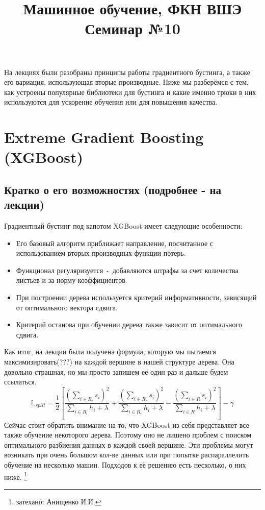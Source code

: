 \documentclass[12pt,fleqn]{article}
\title{Машинное обучение, ФКН ВШЭ\\Семинар №10}
\author{}
\date{}
\begin{document}
\maketitle

На лекциях были разобраны принципы работы градиентного бустинга, а также его вариация, использующая вторые производные. Ниже мы разберёмся с тем, как устроены популярные библиотеки для бустинга и какие именно трюки в них используются для ускорение обучения или для повышения качества.

\section{Extreme Gradient Boosting (XGBoost)}
\subsection{Кратко о его возможностях (подробнее - на лекции)}
Градиентный бустинг под капотом XGBoost имеет следующие особенности:
\begin{itemize}
	\item Его базовый алгоритм приближает направление, посчитанное с использованием вторых производных функции потерь.
	\item Функционал регуляризуется~-~добавляются штрафы за счет количества листьев и за норму коэффициентов.
	\item При построении дерева используется критерий информативности, зависящий от оптимального вектора сдвига.
	\item Критерий останова при обучении дерева также зависит от оптимального сдвига.
\end{itemize}
Как итог, на лекции была получена формула, которую мы пытаемся максимизировать(???) на каждой вершине в нашей структуре дерева. Она довольно страшная, но мы просто запишем её один раз и дальше будем ссылаться.
$$
\mathbb{L}_{split}=\frac{1}{2}\left[\frac{\left(\sum_{i \in R_l} s_i\right)^2}{\sum_{i \in R_l} h_i + \lambda} +\frac{\left(\sum_{i \in R_r} s_i\right)^2}{\sum_{i \in R_r} h_i + \lambda}-\frac{\left(\sum_{i \in R} s_i\right)^2}{\sum_{i \in R} h_i + \lambda}\right]-\gamma
$$
Сейчас стоит обратить внимание на то, что XGBoost из себя представляет все также обучение некоторого дерева. Поэтому оно не лишено проблем с поиском оптимального разбиения данных в каждой своей вершине. Эти проблемы могут возникать при очень большом кол-ве данных или при попытке распараллелить обучение на несколько машин. Подходов к её решению есть несколько, о них ниже.
\footnote{затехано: Анищенко И.И.}
\newpage
\end{document}
